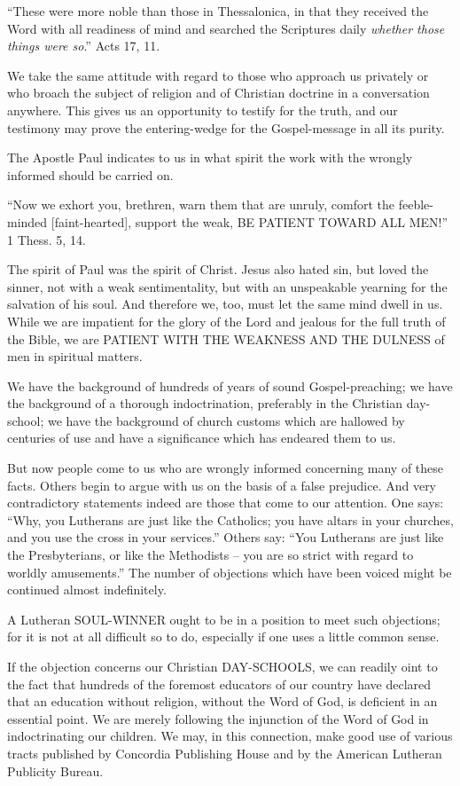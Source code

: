 \documentclass[
]{book}
\begin{document}
``These were more noble than those in Thessalonica, in that they received the Word with all readiness of mind and searched the Scriptures daily \emph{whether those things were so}.'' Acts 17, 11.

We take the same attitude with regard to those who approach us privately or who broach the subject of religion and of Christian doctrine in a conversation anywhere. This gives us an opportunity to testify for the truth, and our testimony may prove the entering-wedge for the Gospel-message in all its purity.

The Apostle Paul indicates to us in what spirit the work with the wrongly informed should be carried on.

``Now we exhort you, brethren, warn them that are unruly, comfort the feeble-minded {[}faint-hearted{]}, support the weak, BE PATIENT TOWARD ALL MEN!'' 1 Thess. 5, 14.

The spirit of Paul was the spirit of Christ. Jesus also hated sin, but loved the sinner, not with a weak sentimentality, but with an unspeakable yearning for the salvation of his soul. And therefore we, too, must let the same mind dwell in us. While we are impatient for the glory of the Lord and jealous for the full truth of the Bible, we are PATIENT WITH THE WEAKNESS AND THE DULNESS of men in spiritual matters.

We have the background of hundreds of years of sound Gospel-preaching; we have the background of a thorough indoctrination, preferably in the Christian day-school; we have the background of church customs which are hallowed by centuries of use and have a significance which has endeared them to us.

But now people come to us who are wrongly informed concerning many of these facts. Others begin to argue with us on the basis of a false prejudice. And very contradictory statements indeed are those that come to our attention. One says: ``Why, you Lutherans are just like the Catholics; you have altars in your churches, and you use the cross in your services.'' Others say: ``You Lutherans are just like the Presbyterians, or like the Methodists -- you are so strict with regard to worldly amusements.'' The number of objections which have been voiced might be continued almost indefinitely.

A Lutheran SOUL-WINNER ought to be in a position to meet such objections; for it is not at all difficult so to do, especially if one uses a little common sense.

If the objection concerns our Christian DAY-SCHOOLS, we can readily oint to the fact that hundreds of the foremost educators of our country have declared that an education without religion, without the Word of God, is deficient in an essential point. We are merely following the injunction of the Word of God in indoctrinating our children. We may, in this connection, make good use of various tracts published by Concordia Publishing House and by the American Lutheran Publicity Bureau.
\end{document}
